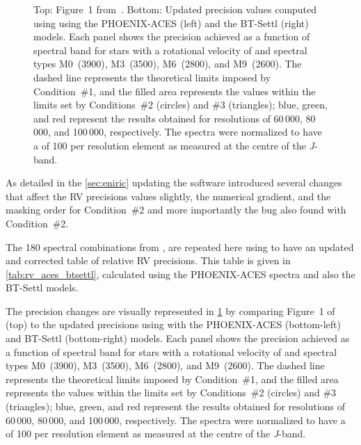 \begin{figure}
{        Top: Figure~1 from~\citet{figueira_radial_2016}.
        Bottom: Updated precision values computed using \eniric{} using the {PHOENIX-ACES} (left) and the {BT-Settl} (right) models.
        Each panel shows the precision achieved as a function of spectral band for stars with a rotational velocity of \kmps{} and spectral types {M0}~(3900\K), {M3}~(3500\K), {M6}~(2800\K), and {M9}~(2600\K{}).
        The dashed line represents the theoretical limits imposed by Condition~\#1, and the filled area represents the values within the limits set by Conditions~\#2 (circles) and \#3 (triangles); blue, green, and red represent the results obtained for resolutions of 60\,000, 80\,000, and 100\,000, respectively.
        The spectra were normalized to have a \snr{} of 100 per resolution element as measured at the centre of the \emph{J}-band.}
    \label{fig:figueria_comparision}
\end{figure}

As detailed in the \cref{sec:eniric} updating the software introduced several changes that affect the {RV} precisions values slightly, the numerical gradient, and the masking order for Condition~\#2 and more importantly the bug also found with Condition~\#2.

The 180 spectral combinations from \citet{figueira_radial_2016}, are repeated here using \eniric{} to have an updated and corrected table of relative {RV} precisions.
This table is given in \cref{tab:rv_aces_btsettl}, calculated using the {PHOENIX-ACES} spectra and also the {BT-Settl} models.
 
The precision changes are visually represented in \cref{fig:figueria_comparision} by comparing Figure~1 of \citet{figueira_radial_2016} (top) to the updated precisions using \eniric{} with the {PHOENIX-ACES} (bottom-left) and {BT-Settl} (bottom-right) models.
Each panel shows the precision achieved as a function of spectral band for stars with a rotational velocity of \kmps{} and spectral types {M0}~(3900\K), {M3}~(3500\K), {M6}~(2800\K), and {M9}~(2600\K).
The dashed line represents the theoretical limits imposed by Condition~\#1, and the filled area represents the values within the limits set by Conditions~\#2 (circles) and \#3 (triangles); blue, green, and red represent the results obtained for resolutions of 60\,000, 80\,000, and 100\,000, respectively.
The spectra were normalized to have a \snr{} of 100 per resolution element as measured at the centre of the \emph{J}-band.

